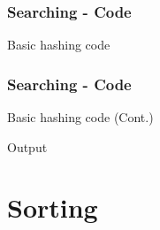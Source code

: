 \documentclass[c, aspectratio=169]{beamer}
\begin{document}
\begin{frame}\frametitle{Searching - Code}
Basic hashing code

\end{frame}

\begin{frame}\frametitle{Searching - Code}
Basic hashing code (Cont.)

Output

\end{frame}

\section{Sorting}
\begin{frame}\end{frame}
\begin{frame}\end{frame}
\begin{frame}\end{frame}
\end{document}

